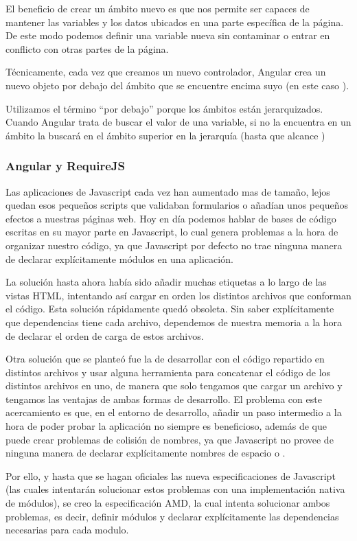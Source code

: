 El beneficio de crear un ámbito nuevo es que nos permite ser capaces de mantener las variables y los datos ubicados en una parte específica de la página. De este modo podemos definir una variable nueva sin contaminar o entrar en conflicto con otras partes de la página.

Técnicamente, cada vez que creamos un nuevo controlador, Angular crea un nuevo objeto  por debajo del ámbito que se encuentre encima suyo (en este caso ).

Utilizamos el término “por debajo” porque los ámbitos están jerarquizados. Cuando Angular trata de buscar el valor de una variable, si no la encuentra en un ámbito la buscará en el ámbito superior en la jerarquía (hasta que alcance ) 

\subsubsection{Angular y RequireJS}
Las aplicaciones de Javascript cada vez han aumentado mas de tamaño, lejos quedan esos pequeños scripts que validaban formularios o añadían unos pequeños efectos a nuestras páginas web.
Hoy en día podemos hablar de bases de código escritas en su mayor parte en Javascript, lo cual genera problemas a la hora de organizar nuestro código, ya que Javascript por defecto no trae ninguna manera de declarar explícitamente módulos en una aplicación.

La solución hasta ahora había sido añadir muchas etiquetas  a lo largo de las vistas HTML, intentando así cargar en orden los distintos archivos que conforman el código. Esta solución rápidamente quedó obsoleta. Sin saber explícitamente que dependencias tiene cada archivo, dependemos de nuestra memoria a la hora de declarar el orden de carga de estos archivos.

Otra solución que se planteó fue la de desarrollar con el código repartido en distintos archivos y usar alguna herramienta para concatenar el código de los distintos archivos en uno, de manera que solo tengamos que cargar un archivo y tengamos las ventajas de ambas formas de desarrollo. El problema con este acercamiento es que, en el entorno de desarrollo, añadir un paso intermedio a la hora de poder probar la aplicación no siempre es beneficioso, además de que puede crear problemas de colisión de nombres, ya que Javascript no provee de ninguna manera de declarar explícitamente nombres de espacio o .

Por ello, y hasta que se hagan oficiales las nueva especificaciones de Javascript (las cuales intentarán solucionar estos problemas con una implementación nativa de módulos), se creo la especificación \ac{AMD}, la cual intenta solucionar ambos problemas, es decir, definir módulos y declarar explícitamente las dependencias necesarias para cada modulo. 

